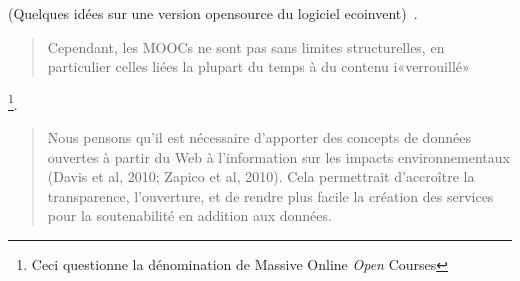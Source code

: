  (Quelques idées sur une version opensource du logiciel ecoinvent)~\cite{mutel_ideas_2014}.

\blockcquote[traduction, Conclusion]{masanet_reflections_2014}{
Cependant, les MOOCs ne sont pas sans limites structurelles, en particulier celles liées la plupart du temps à du contenu i«verrouillé» 
}\footnote{Ceci questionne la dénomination de Massive Online \emph{Open} Courses}.

\blockcquote[traduction, p.14]{lamela_footprinted._2011}{
Nous pensons qu'il est nécessaire d'apporter des concepts de données ouvertes à partir du Web à l'information sur les impacts environnementaux (Davis et al, 2010; Zapico et al, 2010).
Cela permettrait d'accroître la transparence, l'ouverture, et de rendre plus facile la création des services pour la soutenabilité en addition aux données.
}

